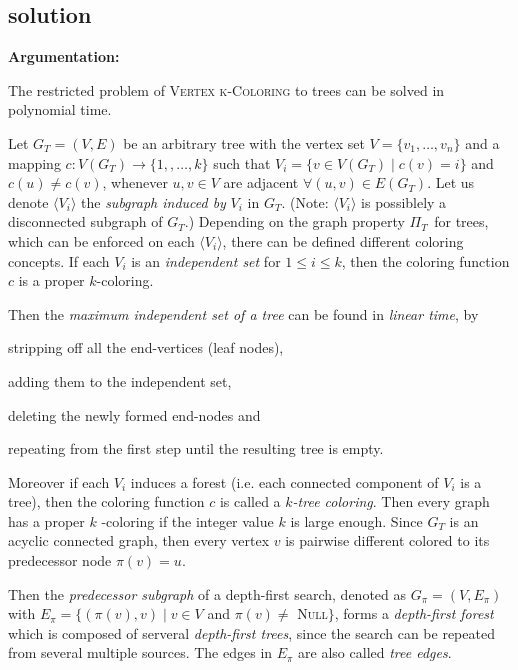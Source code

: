 \subsection{solution}

\noindent \textbf{Argumentation:}

The restricted problem of \textsc{Vertex k-Coloring} to trees can be solved
in polynomial time.

Let $G_{T}=(V,E)$ be an arbitrary tree with the vertex set $V=\{v_{1},\ldots
,v_{n}\}$ and a mapping $c:V(G_{T})\rightarrow \{1,,\ldots ,k\}$ such that $%
V_{i}=\{v\in V(G_{T})\mid c(v)=i\}$ and $c(u)\neq c(v)$, whenever $u,v\in V$
are adjacent $\forall (u,v)\in E(G_{T})$. Let us denote $\langle
V_{i}\rangle $ the \textit{subgraph induced by }$V_{i}$ in $G_{T}.$ (Note: $%
\langle V_{i}\rangle $ is possiblely a disconnected subgraph of $G_{T}$.)
Depending on the graph property $\Pi _{T\text{ }}$for trees, which can be
enforced on each $\langle V_{i}\rangle $, there can be defined different
coloring concepts. If each $V_{i}$ is an \textit{independent set} for $1\leq
i\leq k$, then the coloring function $c$ is a proper $k$-coloring.

Then the \textit{maximum independent set of a tree} can be found in \textit{%
linear time}, by 
\begin{inparaenum}[\itshape 1\upshape)]
\item stripping off all the end-vertices (leaf nodes),
\item adding them to the independent set,
\item deleting the newly formed end-nodes and
\item repeating from the first step until the resulting tree is empty.
\end{inparaenum}Moreover if each $V_{i}$ induces a forest (i.e. each
connected component of $V_{i}$ is a tree), then the coloring function $c$ is
called a $k$\textit{-tree coloring}. Then every graph has a proper $k$%
-coloring if the integer value $k$ is large enough. Since $G_{T}$ is an
acyclic connected graph, then every vertex $v$ is pairwise different colored
to its predecessor node $\pi (v)=u$.

Then the \textit{predecessor subgraph} of a depth-first search, denoted as $%
G_{\pi }=(V,E_{\pi })$ with $E_{\pi }=\{(\pi (v),v)\mid v\in V$ and $\pi
(v)\neq $ \textsc{Null}$\}$, forms a \textit{depth-first forest} which is
composed of serveral \textit{depth-first trees}, since the search can be
repeated from several multiple sources. The edges in $E_{\pi }$ are also
called \textit{tree edges}.

